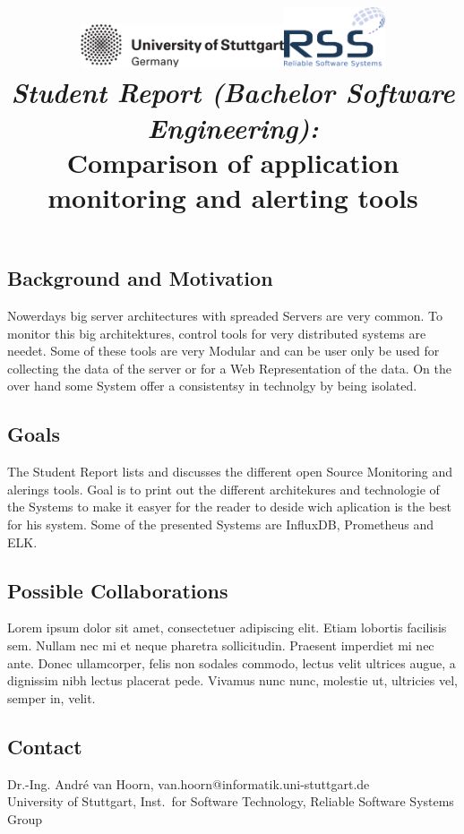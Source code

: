 \documentclass[a4paper,12pt]{article}
\date{}
\title{
\includegraphics[width=6cm]{figures/stuttgart-vector.pdf}\hfill{\includegraphics[width=3cm]{figures/rss_logo.pdf}}
\quad \\ [0.5cm]
{\large \textit{Student Report (Bachelor Software Engineering):}} \\ [1mm]
{\Large Comparison of application monitoring and alerting tools}
}
\begin{document}
	

\maketitle

\thispagestyle{empty}

\vspace{-2.5cm}


\subsection*{Background and Motivation}
Nowerdays big server architectures with spreaded Servers are very common. To monitor this big architektures, control tools for very distributed systems are needet. Some of these tools are very Modular and can be user only be used for collecting the data of the server or for a Web Representation of the data. On the over hand some System offer a consistentsy in technolgy by being isolated.\cite{Heger2017}

\subsection*{Goals}
The Student Report lists and discusses the different open Source Monitoring and alerings tools. Goal is to print out the different architekures and technologie of the Systems to make it easyer for the reader to deside wich aplication is the best for his system.
Some of the presented Systems are InfluxDB, Prometheus and ELK.

\subsection*{Possible Collaborations}
Lorem ipsum dolor sit amet, consectetuer adipiscing elit. Etiam lobortis facilisis sem. Nullam nec
mi et neque pharetra sollicitudin. Praesent imperdiet mi nec ante. Donec ullamcorper, felis non
sodales commodo, lectus velit ultrices augue, a dignissim nibh lectus placerat pede. Vivamus nunc
nunc, molestie ut, ultricies vel, semper in, velit. 

\begin{scriptsize}


\end{scriptsize}

\subsection*{Contact}
Dr.-Ing. André van Hoorn, van.hoorn@informatik.uni-stuttgart.de \\
University of Stuttgart, Inst.\ for Software Technology, Reliable Software Systems Group \\
\end{document}
